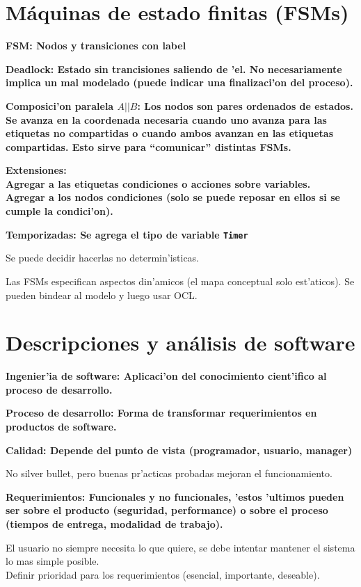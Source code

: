 \documentclass[a4paper,spanish]{article}
\newcommand{\tab}{\hspace*{1cm}}
\newcommand{\defi}[2]{\bfseries #1: \mdseries #2}
\newcommand{\ldefi}[1]{\bfseries #1: \mdseries}
\begin{document}
\section{M\'{a}quinas de estado finitas (FSMs)}

\defi{FSM}{Nodos y transiciones con label}

\defi{Deadlock}{Estado sin trancisiones saliendo de 'el. No necesariamente implica un mal modelado
(puede indicar una finalizaci'on del proceso).}

\defi{Composici'on paralela $A||B$}{Los nodos son pares ordenados de estados. Se avanza en la coordenada
necesaria cuando uno avanza para las etiquetas no compartidas o cuando \textbf{ambos} avanzan en las
etiquetas compartidas. Esto sirve para ``comunicar'' distintas FSMs.}

\ldefi{Extensiones} \\
\tab Agregar a las etiquetas \textbf{condiciones} o \textbf{acciones} sobre variables. \\
\tab Agregar a los nodos condiciones (solo se puede reposar en ellos si se cumple la condici'on).

\defi{Temporizadas}{Se agrega el tipo de variable \texttt{Timer}}

Se puede decidir hacerlas no determin'isticas.

Las FSMs especifican aspectos din'amicos (el mapa conceptual solo est'aticos). Se pueden bindear al modelo
y luego usar OCL.

\section{Descripciones y an\'{a}lisis de software}

\defi{Ingenier'ia de software}{Aplicaci'on del conocimiento cient'ifico al proceso de desarrollo.}

\defi{Proceso de desarrollo}{Forma de transformar requerimientos en productos de software.}

\defi{Calidad}{Depende del punto de vista (programador, usuario, manager)}

No silver bullet, pero buenas pr'acticas probadas mejoran el funcionamiento.

\defi{Requerimientos}{Funcionales y no funcionales, 'estos 'ultimos pueden ser sobre el producto
(seguridad, performance) o sobre el proceso (tiempos de entrega, modalidad de trabajo)}.

El usuario no siempre necesita lo que quiere, se debe intentar mantener el sistema lo mas simple posible. \\
\tab Definir prioridad para los requerimientos (esencial, importante, deseable).
\end{document}

